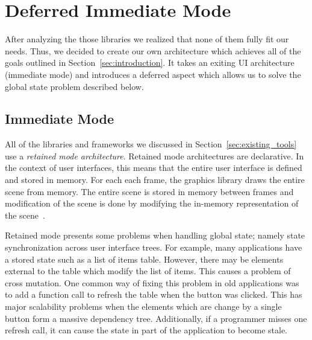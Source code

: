 \documentclass[conference,12pt]{IEEEtran}
\begin{document}




\section{Deferred Immediate Mode}\label{sec:dim}

After analyzing the those libraries we realized that none of them fully fit our
needs. Thus, we decided to create our own architecture which achieves all of the
goals outlined in Section~\ref{sec:introduction}. It takes an exiting UI
architecture (immediate mode) and introduces a deferred aspect which allows us
to solve the global state problem described below.

\subsection{Immediate Mode}
All of the libraries and frameworks we discussed in Section~\ref{sec:existing_tools}
use a \textit{retained mode architecture}. Retained mode architectures are
declarative. In the context of user interfaces, this means that the entire user
interface is defined and stored in memory. For each each frame, the graphics
library draws the entire scene from memory. The entire scene is stored in memory
between frames and modification of the scene is done by modifying the in-memory
representation of the scene~\cite{Microsoft:Retained-vs-Immediate}.

Retained mode presents some problems when handling global state; namely state
synchronization across user interface trees. For example, many applications have
a stored state such as a list of items table. However, there may be elements
external to the table which modify the list of items. This causes a problem of
cross mutation. One common way of fixing this problem in old applications was to
add a function call to refresh the table when the button was clicked. This has
major scalability problems when the elements which are change by a single button
form a massive dependency tree. Additionally, if a programmer misses one refresh
call, it can cause the state in part of the application to become stale.
\end{document}
